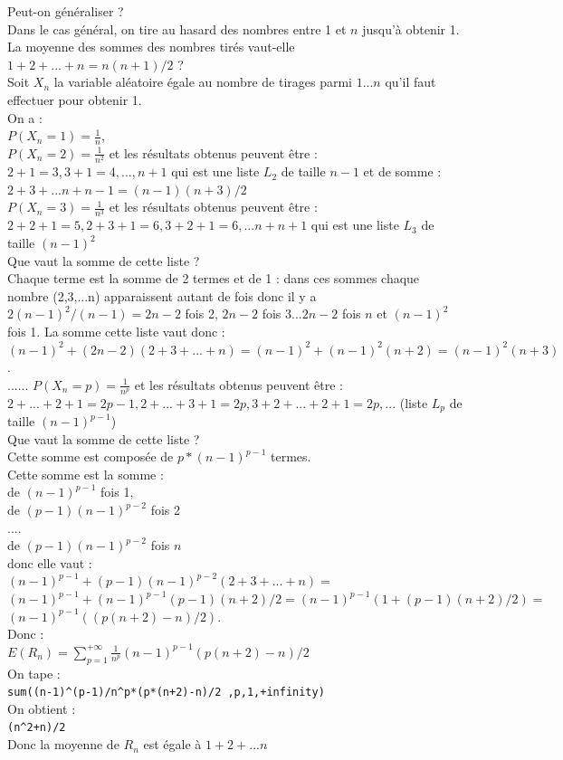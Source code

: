 \documentclass[a4paper,11pt]{book}
\begin{document}
Peut-on g\'en\'eraliser ?\\
Dans le cas g\'en\'eral, on tire au hasard des nombres entre 1 et $n$ jusqu'\`a
obtenir 1. La moyenne des sommes des nombres tir\'es vaut-elle 
$1+2+...+n=n(n+1)/2$ ?\\
Soit $X_n$ la variable al\'eatoire \'egale au nombre de tirages parmi 
$1...n$ qu'il faut effectuer pour obtenir 1.\\
On a :\\
$\displaystyle P(X_n=1)=\frac{1}{n}$,\\
$\displaystyle P(X_n=2)=\frac{1}{n^2}$ et les r\'esultats obtenus peuvent 
\^etre : \\
$2+1=3,3+1=4,...,n+1$ qui est une liste $L_2$ de taille $n-1$ et de somme :\\
$2+3+...n+n-1=(n-1)(n+3)/2$
\\
$\displaystyle P(X_n=3)=\frac{1}{n^3}$ et les r\'esultats obtenus peuvent 
\^etre : \\
$2+2+1=5,2+3+1=6,3+2+1=6,...n+n+1$ qui est une liste $L_3$ de taille 
$(n-1)^2$\\
Que vaut la somme de cette liste ?\\
Chaque terme est la somme de 2 termes et de 1 : dans ces sommes chaque nombre 
(2,3,...n) apparaissent autant de fois donc il y a $2(n-1)^2/(n-1)=2n-2$ fois 2,
$2n-2$ fois 3...$2n-2$ fois $n$ et $(n-1)^2$ fois 1. La somme cette liste vaut 
donc :\\
$(n-1)^2+(2n-2)(2+3+...+n)=(n-1)^2+(n-1)^2(n+2)=(n-1)^2(n+3)$.\\
......
$\displaystyle P(X_n=p)=\frac{1}{n^p}$ et les r\'esultats obtenus peuvent 
\^etre : $2+...+2+1=2p-1,2+...+3+1=2p,3+2+...+2+1=2p,...$ (liste $L_p$ de 
taille $(n-1)^{p-1}$)\\
Que vaut la somme de cette liste ?\\
Cette somme est compos\'ee de $p*(n-1)^{p-1}$ termes.\\
Cette somme est la somme :\\
de $(n-1)^{p-1}$ fois 1,\\
de $(p-1)(n-1)^{p-2}$ fois 2\\
....\\
de $(p-1)(n-1)^{p-2}$ fois $n$\\
 donc elle vaut :\\
$(n-1)^{p-1}+(p-1)(n-1)^{p-2}(2+3+...+n)=$\\
$(n-1)^{p-1}+(n-1)^{p-1}(p-1)(n+2)/2=(n-1)^{p-1}(1+(p-1)(n+2)/2)=$\\
$(n-1)^{p-1}((p(n+2)-n)/2)$.\\
Donc :\\
$E(R_n)=\sum_{p=1}^{+\infty}\frac{1}{n^p}(n-1)^{p-1}(p(n+2)-n)/2$\\
On tape :\\
{\tt sum((n-1)\verb|^|(p-1)/n\verb|^|p*(p*(n+2)-n)/2 ,p,1,+infinity)}\\
On obtient :\\
{\tt (n\verb|^|2+n)/2}\\
Donc la moyenne de $R_n$ est \'egale \`a $1+2+...n$
\end{document}
